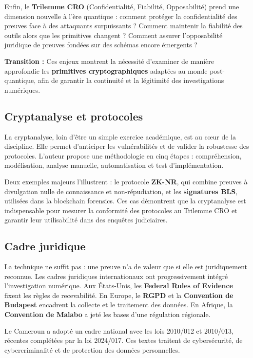 \documentclass[memoire, 12pt]{report}
\begin{document}
Enfin, le \textbf{Trilemme CRO} (Confidentialité, Fiabilité, Opposabilité) 
prend une dimension nouvelle à l’ère quantique : comment protéger la confidentialité 
des preuves face à des attaquants surpuissants ? Comment maintenir la fiabilité 
des outils alors que les primitives changent ? Comment assurer l’opposabilité 
juridique de preuves fondées sur des schémas encore émergents ?  

\textbf{Transition :} Ces enjeux montrent la nécessité d’examiner de manière 
approfondie les \textbf{primitives cryptographiques} adaptées au monde post-quantique, 
afin de garantir la continuité et la légitimité des investigations numériques.  
  

\subsection*{Cryptanalyse et protocoles}
La cryptanalyse, loin d’être un simple exercice académique, est au cœur de la discipline.  
Elle permet d’anticiper les vulnérabilités et de valider la robustesse des protocoles.  
L’auteur propose une méthodologie en cinq étapes : compréhension, modélisation, analyse manuelle, 
automatisation et test d’implémentation.  

Deux exemples majeurs l’illustrent :  
le protocole \textbf{ZK-NR}, qui combine preuves à divulgation nulle de connaissance et non-répudiation, 
et les \textbf{signatures BLS}, utilisées dans la blockchain forensics.  
Ces cas démontrent que la cryptanalyse est indispensable 
pour mesurer la conformité des protocoles au Trilemme CRO et garantir leur utilisabilité dans des enquêtes judiciaires.  

\subsection*{Cadre juridique}
La technique ne suffit pas : une preuve n’a de valeur que si elle est juridiquement reconnue.  
Les cadres juridiques internationaux ont progressivement intégré l’investigation numérique.  
Aux États-Unis, les \textbf{Federal Rules of Evidence} fixent les règles de recevabilité.  
En Europe, le \textbf{RGPD} et la \textbf{Convention de Budapest} encadrent la collecte et le traitement des données.  
En Afrique, la \textbf{Convention de Malabo} a jeté les bases d’une régulation régionale.  

Le Cameroun a adopté un cadre national avec les lois 2010/012 et 2010/013, 
récentes complétées par la loi 2024/017. 
Ces textes traitent de cybersécurité, de cybercriminalité et de protection des données personnelles.  
\end{document}
